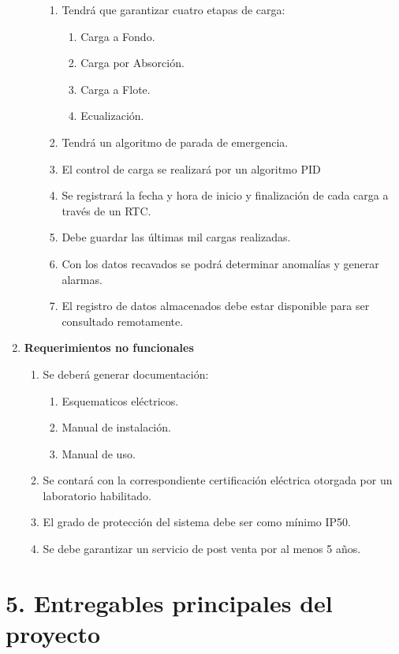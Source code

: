 \documentclass[11pt]{charter}
\begin{document}
\begin{enumerate}
\begin{enumerate}[label*=\arabic*.]
\begin{enumerate}[label*=\arabic*.]
				\item Tendrá que garantizar cuatro etapas de carga:
					\begin{enumerate}[label*=\arabic*.]
						\item Carga a Fondo.
						\item Carga por Absorción.
						\item Carga a Flote.
						\item Ecualización.
					\end{enumerate}
				\item Tendrá un algoritmo de parada de emergencia.
				\item El control de carga se realizará por un algoritmo PID
				\item Se registrará la fecha y hora de inicio y finalización de cada carga a través de un RTC.
				\item Debe guardar las últimas mil cargas realizadas.
				\item Con los datos recavados se podrá determinar anomalías y generar alarmas. 
				\item El registro de datos almacenados debe estar disponible para ser consultado remotamente.
			\end{enumerate}					
	\end{enumerate}
	\item \textbf{Requerimientos no funcionales}
	\begin{enumerate}[label*=\arabic*.]
		\item Se deberá generar documentación:
			\begin{enumerate}[label*=\arabic*.]
				\item Esquematicos eléctricos.
				\item Manual de instalación.
				\item Manual de uso.
			\end{enumerate}
		\item Se contará con la correspondiente certificación eléctrica otorgada por un laboratorio habilitado.
		\item El grado de protección del sistema debe ser como mínimo IP50.
		\item Se debe garantizar un servicio de post venta por al menos 5 años.
	\end{enumerate}
\end{enumerate}


\section{5. Entregables principales del proyecto}
\label{sec:entregables}
\end{document}
